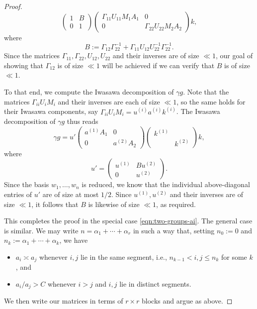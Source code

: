 \documentclass[reqno]{amsart} 
\begin{document}
\begin{proof}
\begin{equation*}
    \begin{pmatrix}
      1 & B \\
      0 & 1
    \end{pmatrix}
    \begin{pmatrix}
      \Gamma_{1 1} U_{1 1} M_1 A_1 & 0 \\
      0 & \Gamma_{2 2} U_{2 2} M_2 A_2
    \end{pmatrix}
    k,
  \end{equation*}
  where
  \begin{equation*}
    B := \Gamma_{1 2} \Gamma_{2 2}^{-1} + \Gamma_{1 1} U_{12} U_{22}^{-1} \Gamma_{22}^{-1}.
  \end{equation*}
  Since the matrices $\Gamma_{11}, \Gamma_{22}, U_{12}, U_{22}$ and their inverses are of size $\ll 1$, our goal of showing that $\Gamma_{12}$ is of size $\ll 1$ will be achieved if we can verify that $B$ is of size $\ll 1$.

  To that end, we compute the Iwasawa decomposition of $\gamma g$.  Note that the matrices $\Gamma_{i i} U_i M_i$ and their inverses are each of size $\ll 1$, so the same holds for their Iwasawa components, say $\Gamma_{i i} U_i M_i = u^{(i)} a^{(i)} k^{(i)}$.  The Iwasawa decomposition of $\gamma g$ thus reads
  \begin{equation*}
    \gamma g = u'
    \begin{pmatrix}
      a^{(1)} A_1 & 0 \\
      0 & a^{(2)} A_2
    \end{pmatrix}
    \begin{pmatrix}
      k^{(1)} &  \\
              & k^{(2)}
    \end{pmatrix}
    k,
  \end{equation*}
  where
  \begin{equation*}
    u' =
    \begin{pmatrix}
      u^{(1)} & B u^{(2)}
      \\
      0 & u^{(2)}
    \end{pmatrix}
    .
  \end{equation*}
  Since the basis $w_1,\dotsc,w_n$ is reduced, we know that the individual above-diagonal entries of $u'$ are of size at most $1/2$.  Since $u^{(1)}, u^{(2)}$ and their inverses are of size $\ll 1$, it follows that $B$ is likewise of size $\ll 1$, as required.

  This completes the proof in the special case \eqref{eqn:two-groups-ai}.  The general case is similar.  We may write $n = \alpha_1 + \dotsb + \alpha_r$ in such a way that, setting $n_0 := 0$ and $n_k := \alpha_1 + \dotsb + \alpha_k$, we have
  \begin{itemize}
  \item $a_i \asymp a_j$ whenever $i,j$ lie in the same segment, i.e., $n_{k-1} < i, j \leq n_k$ for some $k$, and
  \item $a_i / a_j > C$ whenever $i > j$ and $i,j$ lie in distinct segments.
  \end{itemize}
  We then write our matrices in terms of $r \times r$ blocks and argue as above.
\end{proof}
\end{document}
